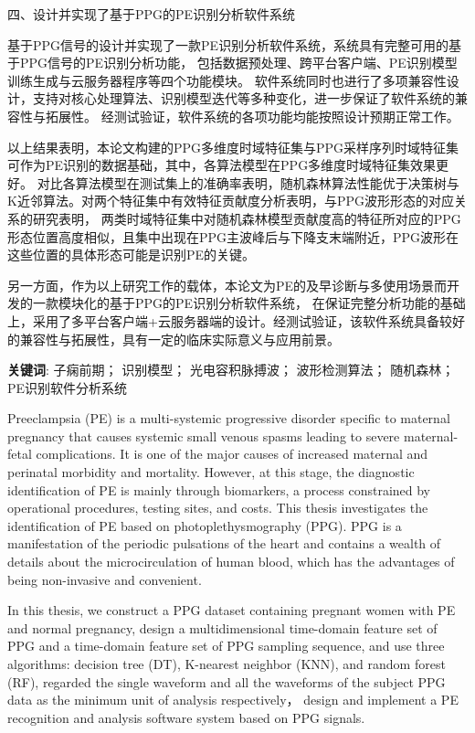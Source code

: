 四、设计并实现了基于PPG的PE识别分析软件系统

基于PPG信号的设计并实现了一款PE识别分析软件系统，系统具有完整可用的基于PPG信号的PE识别分析功能，
包括数据预处理、跨平台客户端、PE识别模型训练生成与云服务器程序等四个功能模块。
软件系统同时也进行了多项兼容性设计，支持对核心处理算法、识别模型迭代等多种变化，进一步保证了软件系统的兼容性与拓展性。
经测试验证，软件系统的各项功能均能按照设计预期正常工作。

以上结果表明，本论文构建的PPG多维度时域特征集与PPG采样序列时域特征集可作为PE识别的数据基础，其中，各算法模型在PPG多维度时域特征集效果更好。
对比各算法模型在测试集上的准确率表明，随机森林算法性能优于决策树与K近邻算法。对两个特征集中有效特征贡献度分析表明，与PPG波形形态的对应关系的研究表明，
两类时域特征集中对随机森林模型贡献度高的特征所对应的PPG形态位置高度相似，且集中出现在PPG主波峰后与下降支末端附近，PPG波形在这些位置的具体形态可能是识别PE的关键。

另一方面，作为以上研究工作的载体，本论文为PE的及早诊断与多使用场景而开发的一款模块化的基于PPG的PE识别分析软件系统，
在保证完整分析功能的基础上，采用了多平台客户端+云服务器端的设计。经测试验证，该软件系统具备较好的兼容性与拓展性，具有一定的临床实际意义与应用前景。

\vspace{2em}

\textbf{关键词}: 子痫前期； 识别模型； 光电容积脉搏波； 波形检测算法； 随机森林；PE识别软件分析系统


\cleardoublepage
{}

Preeclampsia (PE) is a multi-systemic progressive disorder specific to maternal pregnancy that causes systemic small venous spasms 
leading to severe maternal-fetal complications. It is one of the major causes of increased maternal and perinatal morbidity and mortality.  
However, at this stage, the diagnostic identification of PE is mainly through biomarkers, a process constrained by operational procedures, 
testing sites, and costs. 
This thesis investigates the identification of PE based on photoplethysmography (PPG). PPG is a manifestation of the periodic pulsations 
of the heart and contains a wealth of details about the microcirculation of human blood, which has the advantages of being non-invasive and convenient.

In this thesis, we construct a PPG dataset containing pregnant women with PE and normal pregnancy, design a multidimensional time-domain feature set of PPG and 
a time-domain feature set of PPG sampling sequence, and use three algorithms: decision tree (DT), K-nearest neighbor (KNN), and random forest (RF), 
regarded the single waveform and all the waveforms of the subject PPG data as the minimum unit of analysis respectively， design and implement a PE recognition and analysis software system 
based on PPG signals. 

